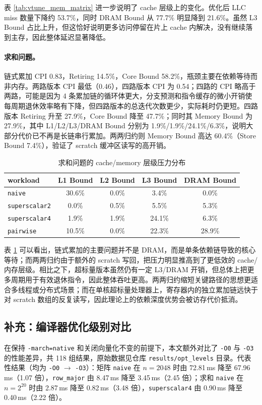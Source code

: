 \documentclass[a4paper,11pt,UTF8]{ctexart}
\begin{document}
表 \ref{tab:vtune_mem_matrix} 进一步说明了 cache 层级上的变化。优化后 LLC miss 数量下降约 53.7\%，同时 DRAM Bound 从 77.7\% 明显降到 21.6\%。虽然 L3 Bound 占比上升，但这恰好说明更多访问停留在片上 cache 内解决，没有继续落到主存，因此整体延迟显著降低。

\paragraph{求和问题。}
链式累加 CPI 0.83，Retiring 14.5\%，Core Bound 58.2\%，瓶颈主要在依赖等待而非内存。两路版本 CPI 最低（0.46），四路版本 CPI 为 0.54；四路的 CPI 略高于两路，可能是因为 4 条累加链的循环体更大，分支预测和指令缓存的微小开销使每周期退休效率略有下降，但四路版本的总迭代次数更少，实际耗时仍更短。四路版本 Retiring 升至 27.9\%，Core Bound 降至 47.7\%；同时其 Memory Bound 为 27.9\%，其中 L1/L2/L3/DRAM Bound 分别为 1.9\%/1.9\%/24.1\%/6.3\%，说明大部分代价已不再是长链串行累加。两两归约则 Memory Bound 高达 60.4\%（Store Bound 7.4\%），验证了 scratch 缓冲区读写的高开销。

\begin{table}[H]
  \centering\scriptsize
  \begin{tabular}{lcccc}
    \toprule
    workload & L1 Bound & L2 Bound & L3 Bound & DRAM Bound \\
    \midrule
    \texttt{naive} & 30.6\% & 0.0\% & 3.4\% & 0.0\% \\
    \texttt{superscalar2} & 0.0\% & 0.5\% & 5.5\% & 5.3\% \\
    \texttt{superscalar4} & 1.9\% & 1.9\% & 24.1\% & 6.3\% \\
    \texttt{pairwise} & 10.5\% & 0.0\% & 22.3\% & 28.9\% \\
    \bottomrule
  \end{tabular}
  \caption{求和问题的 cache/memory 层级压力分布}
  \label{tab:vtune_mem_sum}
\end{table}

表 \ref{tab:vtune_mem_sum} 可以看出，链式累加的主要问题并不是 DRAM，而是单条依赖链导致的核心等待；而两两归约由于额外的 scratch 写回，把压力明显推高到了更低效的 cache/内存层级。相比之下，超标量版本虽然仍有一定 L3/DRAM 开销，但总体上把更多周期用于有效退休指令，因此整体吞吐更高。两两归约缩短关键路径的思想更适合多线程或分布式场景；而在单核超标量处理器上，寄存器内的独立累加链远快于对 scratch 数组的反复读写，因此理论上的依赖深度优势会被访存代价抵消。

\subsection{补充：编译器优化级别对比}
在保持 \texttt{-march=native} 和关闭向量化不变的前提下，本文额外对比了 \texttt{-O0} 与 \texttt{-O3} 的性能差异，共 118 组结果，原始数据见仓库 \texttt{results/opt\_levels} 目录。代表性结果（均为 \texttt{-O0} $\to$ \texttt{-O3}）：矩阵 \texttt{naive} 在 $n=2048$ 时由 72.81\,ms 降至 67.96\,ms（1.07 倍），\texttt{row\_major} 由 8.47\,ms 降至 3.45\,ms（2.45 倍）；求和 \texttt{naive} 在 $n=2^{20}$ 时由 2.87\,ms 降至 0.82\,ms（3.48 倍），\texttt{superscalar4} 由 0.90\,ms 降至 0.40\,ms（2.22 倍）。
\end{document}
